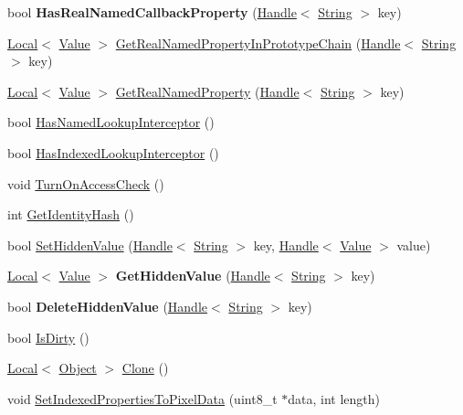\begin{DoxyCompactItemize}
\item 
\hypertarget{classv8_1_1_object_aa501acb241c3b3a941b9f48c23b1e1cd}{}bool {\bfseries Has\+Real\+Named\+Callback\+Property} (\hyperlink{classv8_1_1_handle}{Handle}$<$ \hyperlink{classv8_1_1_string}{String} $>$ key)\label{classv8_1_1_object_aa501acb241c3b3a941b9f48c23b1e1cd}

\item 
\hyperlink{classv8_1_1_local}{Local}$<$ \hyperlink{classv8_1_1_value}{Value} $>$ \hyperlink{classv8_1_1_object_a36273f157697ff5e8e776a1461755182}{Get\+Real\+Named\+Property\+In\+Prototype\+Chain} (\hyperlink{classv8_1_1_handle}{Handle}$<$ \hyperlink{classv8_1_1_string}{String} $>$ key)
\item 
\hyperlink{classv8_1_1_local}{Local}$<$ \hyperlink{classv8_1_1_value}{Value} $>$ \hyperlink{classv8_1_1_object_a0eeeb35c6dc002a8359ebc445a49e964}{Get\+Real\+Named\+Property} (\hyperlink{classv8_1_1_handle}{Handle}$<$ \hyperlink{classv8_1_1_string}{String} $>$ key)
\item 
bool \hyperlink{classv8_1_1_object_a1e96fcb9ee17101c0299ec68f2cf8610}{Has\+Named\+Lookup\+Interceptor} ()
\item 
bool \hyperlink{classv8_1_1_object_a278913bcd203434870ce5184a538a9af}{Has\+Indexed\+Lookup\+Interceptor} ()
\item 
void \hyperlink{classv8_1_1_object_a6e9fe342c0f77995defa6b479d01a3bd}{Turn\+On\+Access\+Check} ()
\item 
int \hyperlink{classv8_1_1_object_ac1ece41e81a499920ec3a2a3471653bc}{Get\+Identity\+Hash} ()
\item 
bool \hyperlink{classv8_1_1_object_a2200482b09feb914dc91d8256671f7f0}{Set\+Hidden\+Value} (\hyperlink{classv8_1_1_handle}{Handle}$<$ \hyperlink{classv8_1_1_string}{String} $>$ key, \hyperlink{classv8_1_1_handle}{Handle}$<$ \hyperlink{classv8_1_1_value}{Value} $>$ value)
\item 
\hypertarget{classv8_1_1_object_a0fb148558e1749b04a2e13b2c9fa4441}{}\hyperlink{classv8_1_1_local}{Local}$<$ \hyperlink{classv8_1_1_value}{Value} $>$ {\bfseries Get\+Hidden\+Value} (\hyperlink{classv8_1_1_handle}{Handle}$<$ \hyperlink{classv8_1_1_string}{String} $>$ key)\label{classv8_1_1_object_a0fb148558e1749b04a2e13b2c9fa4441}

\item 
\hypertarget{classv8_1_1_object_ab1d274da1949b1f68087728760ee4172}{}bool {\bfseries Delete\+Hidden\+Value} (\hyperlink{classv8_1_1_handle}{Handle}$<$ \hyperlink{classv8_1_1_string}{String} $>$ key)\label{classv8_1_1_object_ab1d274da1949b1f68087728760ee4172}

\item 
bool \hyperlink{classv8_1_1_object_a3c1f8cfb754b5d29d5f1998b2047befd}{Is\+Dirty} ()
\item 
\hyperlink{classv8_1_1_local}{Local}$<$ \hyperlink{classv8_1_1_object}{Object} $>$ \hyperlink{classv8_1_1_object_a5018c9d085aa71f65530cf1e073a04ad}{Clone} ()
\item 
void \hyperlink{classv8_1_1_object_a6c552c4817b9a0eff1fb12b7ef089026}{Set\+Indexed\+Properties\+To\+Pixel\+Data} (uint8\+\_\+t $\ast$data, int length)
\end{DoxyCompactItemize}
